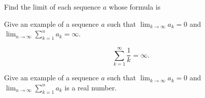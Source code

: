 \documentclass[12pt,fleqn,answers]{exam}
\begin{document}
\begin{questions}
    \question Find the limit of each sequence $a$ whose formula is
    
    \question   Give an example of a sequence $a$ such that
    $\displaystyle \lim_{k \to \infty} a_k = 0$ and $\displaystyle \lim_{n \to \infty} \sum_{k=1}^n a_k  = \infty$.
    
    \begin{solution}[1.50in]
        \begin{equation*}
              \sum_{k=1}^\infty \frac{1}{k} = \infty.
        \end{equation*}
    \end{solution}
    \question   Give an example of a sequence $a$ such that
    $\displaystyle \lim_{k \to \infty} a_k = 0$ and $\displaystyle \lim_{n \to \infty} \sum_{k=1}^n a_k$ is a real 
    number.
    

\end{questions}
\end{document}
